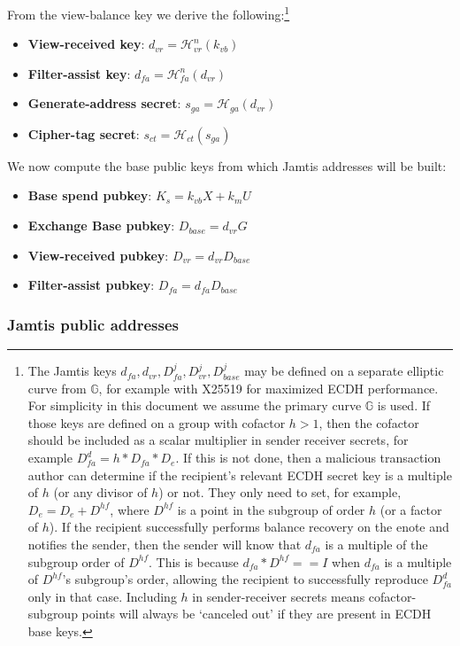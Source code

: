 From the view-balance key we derive the following:\footnote{The Jamtis keys $d_{fa}, d_{vr}, D^j_{fa}, D^j_{vr}, D^j_{base}$ may be defined on a separate elliptic curve from $\mathbb{G}$, for example with X25519 for maximized ECDH performance. For simplicity in this document we assume the primary curve $\mathbb{G}$ is used. If those keys are defined on a group with cofactor $h > 1$, then the cofactor should be included as a scalar multiplier in sender receiver secrets, for example $D^d_{fa} = h * D_{fa} * D_e$. If this is not done, then a malicious transaction author can determine if the recipient's relevant ECDH secret key is a multiple of $h$ (or any divisor of $h$) or not. They only need to set, for example, $D_e = D_e + D^{hf}$, where $D^{hf}$ is a point in the subgroup of order $h$ (or a factor of $h$). If the recipient successfully performs balance recovery on the enote and notifies the sender, then the sender will know that $d_{fa}$ is a multiple of the subgroup order of $D^{hf}$. This is because $d_{fa} * D^{hf} == I$ when $d_{fa}$ is a multiple of $D^{hf}$'s subgroup's order, allowing the recipient to successfully reproduce $D^d_{fa}$ only in that case. Including $h$ in sender-receiver secrets means cofactor-subgroup points will always be `canceled out' if they are present in ECDH base keys.}
\begin{itemize}
    \item \textbf{View-received key}: $d_{vr} = \mathcal{H}^n_{vr}(k_{vb})$
    \item \textbf{Filter-assist key}: $d_{fa} = \mathcal{H}^n_{fa}(d_{vr})$
    \item \textbf{Generate-address secret}: $s_{ga} = \mathcal{H}_{ga}(d_{vr})$
    \item \textbf{Cipher-tag secret}: $s_{ct} = \mathcal{H}_{ct}(s_{ga})$
\end{itemize}

We now compute the base public keys from which Jamtis addresses will be built:
\begin{itemize}
    \item \textbf{Base spend pubkey}: $K_s = k_{vb} X + k_m U$
    \item \textbf{Exchange Base pubkey}: $D_{base} = d_{vr} G$
    \item \textbf{View-received pubkey}: $D_{vr} = d_{vr} D_{base}$
    \item \textbf{Filter-assist pubkey}: $D_{fa} = d_{fa} D_{base}$
\end{itemize}

\subsubsection{Jamtis public addresses}
\label{subsubsec:jamtis-public-addresses}

